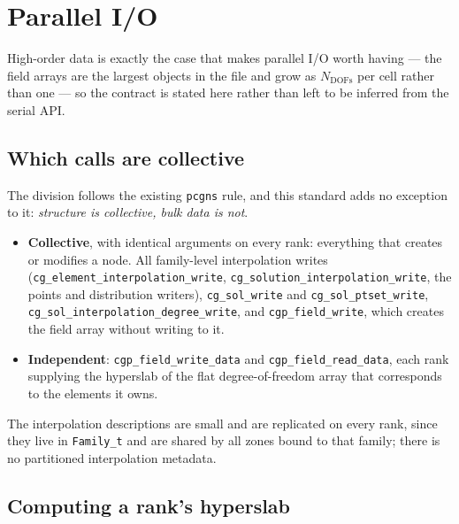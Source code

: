 \documentclass[11pt,letterpaper]{article}
\newif\ifvfourdraft
\newenvironment{v4block}{\ifvfourdraft\color{v4violet}\fi\ignorespaces}{\par}
\newcommand{\vfourmark}{\ifvfourdraft\textcolor{v4violet}{\textbf{[v4]}}\ \fi}
\begin{document}
\begin{v4block}
\section{\vfourmark Parallel I/O}
\label{sec:parallel}

High-order data is exactly the case that makes parallel I/O worth having --- the
field arrays are the largest objects in the file and grow as $N_\mathrm{DOFs}$ per
cell rather than one --- so the contract is stated here rather than left to be
inferred from the serial API.

\subsection{Which calls are collective}

The division follows the existing \texttt{pcgns} rule, and this standard adds no
exception to it: \emph{structure is collective, bulk data is not}.

\begin{itemize}[nosep,leftmargin=1.5em]
  \item \textbf{Collective}, with identical arguments on every rank: everything
    that creates or modifies a node.  All family-level interpolation writes
    (\texttt{cg\_element\_interpolation\_write},
    \texttt{cg\_solution\_interpolation\_write}, the points and distribution
    writers), \texttt{cg\_sol\_write} and \texttt{cg\_sol\_ptset\_write},
    \texttt{cg\_sol\_interpolation\_degree\_write}, and
    \texttt{cgp\_field\_write}, which creates the field array without writing to
    it.
  \item \textbf{Independent}: \texttt{cgp\_field\_write\_data} and
    \texttt{cgp\_field\_read\_data}, each rank supplying the hyperslab of the
    flat degree-of-freedom array that corresponds to the elements it owns.
\end{itemize}

\noindent The interpolation descriptions are small and are replicated on every
rank, since they live in \texttt{Family\_t} and are shared by all zones bound to
that family; there is no partitioned interpolation metadata.

\subsection{Computing a rank's hyperslab}


\end{v4block}
\end{document}
